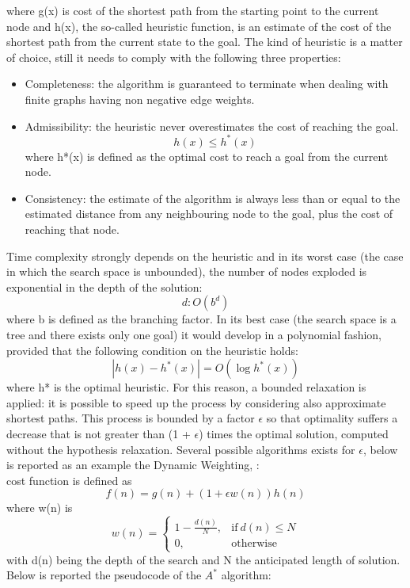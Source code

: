 where g(x) is cost of the shortest path from the starting point to the current node and h(x), the so-called heuristic function, is an estimate of the cost of the shortest path from the current state to the goal.
The kind of heuristic is a matter of choice, still it needs to comply with the following three properties:
\begin{itemize}
    \item Completeness: the algorithm is guaranteed to terminate when dealing with finite graphs having non negative edge weights.
    \item Admissibility: the heuristic never overestimates the cost of reaching the goal.
    \newpage
    \begin{equation}
        h(x) \le h^*(x)
    \end{equation}
    where h*(x) is defined as the optimal cost to reach a goal from the current node.
    
    \item Consistency: the estimate of the algorithm is always less than or equal to the estimated distance from any neighbouring node to the goal, plus the cost of reaching that node.
\end{itemize}
Time complexity strongly depends on the heuristic and in its worst case (the case in which the search space is unbounded), the number of nodes exploded is exponential in the depth of the solution:
\begin{equation}
    d: O(b^d)
\end{equation}
where b is defined as the branching factor.
In its best case (the search space is a tree and there exists only one goal) it would develop in a polynomial fashion, provided that the following condition on the heuristic holds:
\begin{equation}
    |h(x) - h^*(x)| = O(\log{h^*(x)})
\end{equation}
where h* is the optimal heuristic.
For this reason, a bounded relaxation is applied: it is possible to speed up the process by considering also approximate shortest paths. This process is bounded by a factor $\epsilon$ so that optimality  suffers a decrease that is not greater than (1 + $\epsilon$) times the optimal solution, computed without the hypothesis relaxation.
Several possible algorithms exists for $\epsilon$, below is reported as an example the Dynamic Weighting, \citet{10.5555/1624775.1624777}:\\
cost function is defined as
\begin{equation}
    f(n) = g(n) + (1 + \epsilon w(n))h(n)
\end{equation}
where w(n) is
\begin{equation}
    w(n) = 
    \begin{cases}
1 - \frac{d(n)}{N}, & \text{if}\ d(n) \le N \\
0 , & \text{otherwise}
\end{cases}
\end{equation}
with d(n) being the depth of the search and N the anticipated length of solution.
Below is reported the pseudocode of the $A^{*}$ algorithm:

